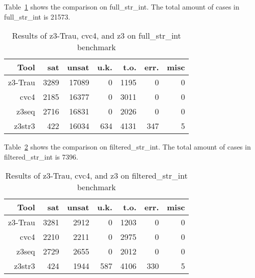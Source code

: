 Table~\ref{table:full_str_int} shows the comparison on full\_str\_int. The total amount of cases in full\_str\_int is 21573.
\begin{table}[]
\caption{Results of z3-Trau, cvc4, and z3 on full\_str\_int benchmark}
\begin{tabular}{|r|r|r|r|r|r|r|}
\hline
Tool		& sat & unsat & u.k. & t.o. & err. & misc \\ \hline\hline
z3-Trau		& 3289 & 17089 & 0 & 1195 & 0 & 0 \\ 
cvc4		& 2185 & 16377 & 0 & 3011 & 0 & 0 \\ 
z3seq		& 2716 & 16831 & 0 & 2026 & 0 & 0 \\ 
z3str3		& 422 & 16034 & 634 & 4131 & 347 & 5 \\ \hline
\end{tabular}
\label{table:full_str_int}
\end{table}

Table~\ref{table:filtered_str_int} shows the comparison on filtered\_str\_int.  The total amount of cases in filtered\_str\_int is 7396.

\begin{table}[]
\caption{Results of z3-Trau, cvc4, and z3 on filtered\_str\_int benchmark}
\begin{tabular}{|r|r|r|r|r|r|r|}
\hline
Tool		& sat & unsat & u.k. & t.o. & err. & misc \\ \hline\hline
z3-Trau		& 3281 & 2912 & 0 & 1203 & 0 & 0 \\ 
cvc4		& 2210 & 2211 & 0 & 2975 & 0 & 0 \\ 
z3seq		& 2729 & 2655 & 0 & 2012 & 0 & 0 \\ 
z3str3		& 424 & 1944 & 587 & 4106 & 330 & 5 \\ \hline
\end{tabular}
\label{table:filtered_str_int}
\end{table}
